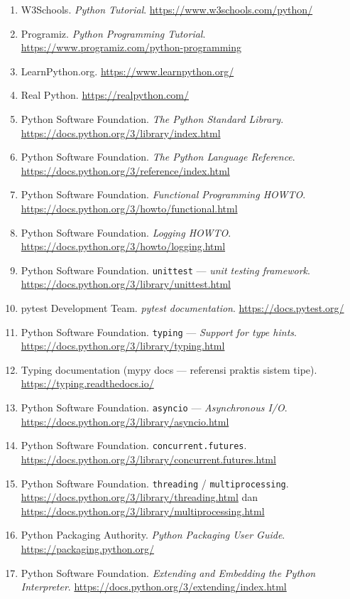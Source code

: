 \begin{enumerate}[leftmargin=*]
  \item W3Schools. \textit{Python Tutorial}. \url{https://www.w3schools.com/python/}
  \item Programiz. \textit{Python Programming Tutorial}. \url{https://www.programiz.com/python-programming}
  \item LearnPython.org. \url{https://www.learnpython.org/}
  \item Real Python. \url{https://realpython.com/}
  \item Python Software Foundation. \textit{The Python Standard Library}. \url{https://docs.python.org/3/library/index.html}
  \item Python Software Foundation. \textit{The Python Language Reference}. \url{https://docs.python.org/3/reference/index.html}
  \item Python Software Foundation. \textit{Functional Programming HOWTO}. \url{https://docs.python.org/3/howto/functional.html}
  \item Python Software Foundation. \textit{Logging HOWTO}. \url{https://docs.python.org/3/howto/logging.html}
  \item Python Software Foundation. \texttt{unittest} --- \textit{unit testing framework}. \url{https://docs.python.org/3/library/unittest.html}
  \item pytest Development Team. \textit{pytest documentation}. \url{https://docs.pytest.org/}
  \item Python Software Foundation. \texttt{typing} --- \textit{Support for type hints}. \url{https://docs.python.org/3/library/typing.html}
  \item Typing documentation (mypy docs --- referensi praktis sistem tipe). \url{https://typing.readthedocs.io/}
  \item Python Software Foundation. \texttt{asyncio} --- \textit{Asynchronous I/O}. \url{https://docs.python.org/3/library/asyncio.html}
  \item Python Software Foundation. \texttt{concurrent.futures}. \url{https://docs.python.org/3/library/concurrent.futures.html}
  \item Python Software Foundation. \texttt{threading} / \texttt{multiprocessing}. \url{https://docs.python.org/3/library/threading.html} dan \url{https://docs.python.org/3/library/multiprocessing.html}
  \item Python Packaging Authority. \textit{Python Packaging User Guide}. \url{https://packaging.python.org/}
  \item Python Software Foundation. \textit{Extending and Embedding the Python Interpreter}. \url{https://docs.python.org/3/extending/index.html}

\end{enumerate}
